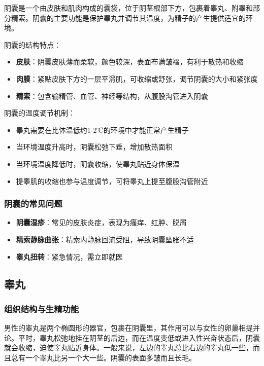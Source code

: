 阴囊是一个由皮肤和肌肉构成的囊袋，位于阴茎根部下方，包裹着睾丸、附睾和部分精索。阴囊的主要功能是保护睾丸并调节其温度，为精子的产生提供适宜的环境。

阴囊的结构特点：
\begin{itemize}
    \item \textbf{皮肤}：阴囊皮肤薄而柔软，颜色较深，表面布满皱褶，有利于散热和收缩
    \item \textbf{肉膜}：紧贴皮肤下方的一层平滑肌，可收缩或舒张，调节阴囊的大小和紧张度
    \item \textbf{精索}：包含输精管、血管、神经等结构，从腹股沟管进入阴囊
\end{itemize}

阴囊的温度调节机制：
\begin{itemize}
    \item 睾丸需要在比体温低约1-2℃的环境中才能正常产生精子
    \item 当环境温度升高时，阴囊松弛下垂，增加散热面积
    \item 当环境温度降低时，阴囊收缩，使睾丸贴近身体保温
    \item 提睾肌的收缩也参与温度调节，可将睾丸上提至腹股沟管附近
\end{itemize}

\subsubsection{阴囊的常见问题}

\begin{itemize}
    \item \textbf{阴囊湿疹}：常见的皮肤炎症，表现为瘙痒、红肿、脱屑
    \item \textbf{精索静脉曲张}：精索内静脉回流受阻，导致阴囊坠胀不适
    \item \textbf{睾丸扭转}：紧急情况，需立即就医
\end{itemize}

\subsection{睾丸}
\subsubsection{组织结构与生精功能}

男性的睾丸是两个椭圆形的器官，包裹在阴囊里，其作用可以与女性的卵巢相提并论。平时，睾丸松弛地挂在阴茎的后边，而在温度变低或进入性兴奋状态后，阴囊就会收缩，迫使睾丸贴近身体。一般来说，左边的睾丸总比右边的睾丸低一些，而且总有一个睾丸比另一个大一些。阴囊的表面多皱而且长毛。

